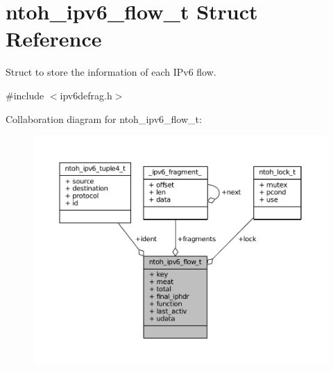 \hypertarget{structntoh__ipv6__flow__t}{\section{ntoh\-\_\-ipv6\-\_\-flow\-\_\-t Struct Reference}
\label{structntoh__ipv6__flow__t}
}


Struct to store the information of each I\-Pv6 flow.  




{\ttfamily \#include $<$ipv6defrag.\-h$>$}



Collaboration diagram for ntoh\-\_\-ipv6\-\_\-flow\-\_\-t\-:
\nopagebreak
\begin{figure}[H]
\begin{center}
\leavevmode
\includegraphics[width=350pt]{structntoh__ipv6__flow__t__coll__graph}
\end{center}
\end{figure}
